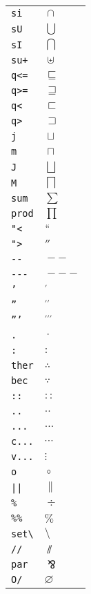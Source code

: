 \begin{longtable}{ll}
\texttt{si}&${}\cap {}$\\
\texttt{sU}&${}\bigcup {}$\\
\texttt{sI}&${}\bigcap {}$\\
\texttt{su+}&${}\uplus {}$\\
\texttt{q<=}&${}\sqsubseteq {}$\\
\texttt{q>=}&${}\sqsupseteq {}$\\
\texttt{q<}&${}\sqsubset {}$\\
\texttt{q>}&${}\sqsupset {}$\\
\texttt{j}&${}\sqcup {}$\\
\texttt{m}&${}\sqcap {}$\\
\texttt{J}&${}\bigsqcup {}$\\
\texttt{M}&${}\bigsqcap {}$\\
\texttt{sum}&${}\sum {}$\\
\texttt{prod}&${}\prod {}$\\
\texttt{"<}&${}``{}$\\
\texttt{">}&${}''{}$\\
\texttt{{-}{-}}&${}--{}$\\
\texttt{{-}{-}{-}}&${}---{}$\\
\texttt{'}&${}^{\prime} {}$\\
\texttt{''}&${}^{\prime\prime} {}$\\
\texttt{'''}&${}^{\prime\prime\prime} {}$\\
\texttt{.}&${}\cdotp {}$\\
\texttt{:}&${}: {}$\\
\texttt{ther}&${}\therefore {}$\\
\texttt{bec}&${}\because {}$\\
\texttt{::}&${}:: {}$\\
\texttt{..}&${}.. {}$\\
\texttt{...}&${}\ldots {}$\\
\texttt{c...}&${}\cdots {}$\\
\texttt{v...}&${}\vdots {}$\\
\texttt{o}&${}\circ {}$\\
\texttt{||}&${}\| {}$\\
\texttt{\%}&${}\div {}$\\
\texttt{\%\%}&${}\% {}$\\
\texttt{set\textbackslash }&${}\setminus {}$\\
\texttt{//}&${}\sslash {}$\\
\texttt{par}&${}\bindnasrepma {}$\\
\texttt{O/}&${}\varnothing {}$\\

\end{longtable}
